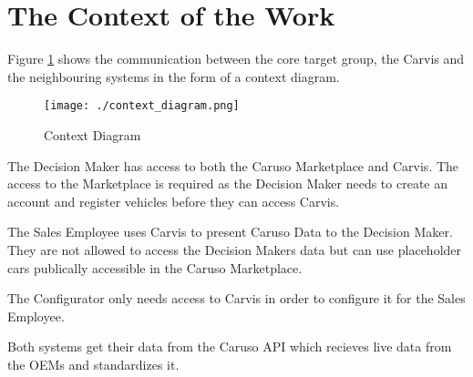 \section{The Context of the Work}
Figure \ref*{ScopeOfWork:ContextDiagram} shows the communication between the core target group, the Carvis and the neighbouring systems in the form of a context diagram.

\begin{figure}[ht]
  \centering
  \texttt{[image: ./context\_diagram.png]}
  \caption{Context Diagram}
  \label{ScopeOfWork:ContextDiagram}
\end{figure}

The Decision Maker has access to both the Caruso Marketplace and Carvis. The access to the Marketplace is required as the Decision Maker needs to create an account and register vehicles before they can access Carvis.

The Sales Employee uses Carvis to present Caruso Data to the Decision Maker. They are not allowed to access the Decision Makers data but can use placeholder cars publically accessible in the Caruso Marketplace.

The Configurator only needs access to Carvis in order to configure it for the Sales Employee.

Both systems get their data from the Caruso API which recieves live data from the OEMs and standardizes it.
